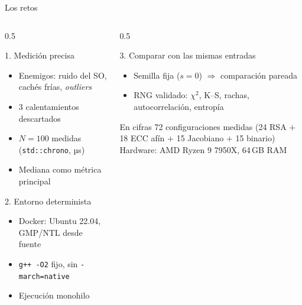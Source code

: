 \documentclass[aspectratio=169,11pt]{beamer}
\begin{document}
\begin{frame}{Los retos}
  \begin{columns}[t]
    \begin{column}{0.5\textwidth}
      \begin{block}{1. Medición precisa}
        \scriptsize
        \begin{itemize}\scriptsize
          \setlength{\itemsep}{1pt}
          \item Enemigos: ruido del SO, cachés frías, \emph{outliers}
          \item \alert{3 calentamientos} descartados
          \item \alert{$N=100$} medidas (\texttt{std::chrono}, µs)
          \item \alert{Mediana} como métrica principal
        \end{itemize}
      \end{block}
      \begin{block}{2. Entorno determinista}
        \scriptsize
        \begin{itemize}\scriptsize
          \setlength{\itemsep}{1pt}
          \item \alert{Docker}: Ubuntu 22.04, GMP/NTL desde fuente
          \item \texttt{g++ -O2} fijo, sin \texttt{-march=native}
          \item Ejecución \alert{monohilo}
        \end{itemize}
      \end{block}
    \end{column}
    \begin{column}{0.5\textwidth}
      \begin{block}{3. Comparar con las mismas entradas}
        \scriptsize
        \begin{itemize}\scriptsize
          \setlength{\itemsep}{1pt}
          \item \alert{Semilla fija} ($s{=}0$) $\Rightarrow$ comparación \alert{pareada}
          \item RNG \alert{validado}: $\chi^2$, K--S, rachas, autocorrelación, entropía
        \end{itemize}
      \end{block}
      \begin{alertblock}{En cifras}
        \scriptsize 72 configuraciones medidas (24 RSA $+$ 18 ECC afín $+$ 15 Jacobiano
        $+$ 15 binario)\\[0.3ex]
        Hardware: AMD Ryzen 9 7950X, 64\,GB RAM
      \end{alertblock}

\end{column}
\end{columns}
\end{frame}
\end{document}
